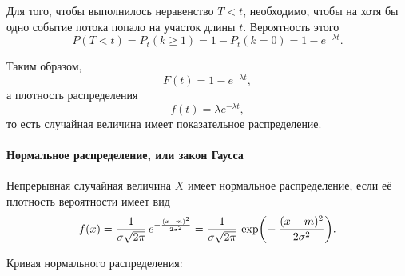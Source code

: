 \documentclass[a4paper]{article}
\DeclareMathOperator{\expo}{exp}
\newcommand{\sgeq}{\geqslant}
\newcommand{\sqrtt}[1]{\sqrt{\vphantom{qb} #1}}
\begin{document}
                    Для того, чтобы выполнилось неравенство $T < t$, необходимо, чтобы на хотя бы одно событие потока попало на участок длины $t$. Вероятность этого
                    \begin{equation*}
                        P(T < t) = P_t (k \sgeq 1) = 1 - P_t (k = 0) = 1 - e^{-\lambda t} .
                    \end{equation*}

                    Таким образом,
                    \begin{equation*}
                        F(t) = 1 - e^{-\lambda t} ,
                    \end{equation*}
                    а плотность распределения
                    \begin{equation*}
                        f(t) = \lambda e^{-\lambda t} ,
                    \end{equation*}
                    то есть случайная величина имеет показательное распределение.

                \paragraph{Нормальное распределение, или закон Гаусса}

                    Непрерывная случайная величина $X$ имеет нормальное распределение, если её плотность вероятности имеет вид
                    \begin{equation*}
                        f(x) = \frac{1}{\sigma \sqrtt{2 \pi}} \,
                            e^{-\frac{(x - m)^\text{\tiny 2}}{2 \sigma^\text{\tiny 2}}} =
                            \frac{1}{\sigma \sqrtt{2 \pi}} \,
                             \expo \! \bigg( \! -\frac{(x - m)^2}{2 \sigma^2} \bigg) .
                    \end{equation*}

                    Кривая нормального распределения:

\end{document}
